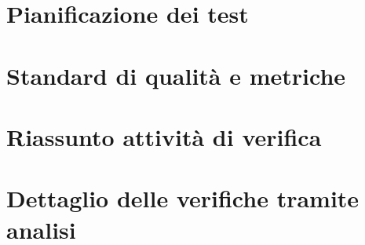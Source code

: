 \newpage
\section{Pianificazione dei test}


\appendix

\newpage
\section{Standard di qualità e metriche}

\label{standard}

\newpage
\section{Riassunto attività di verifica}


\newpage
\section{Dettaglio delle verifiche tramite analisi}




